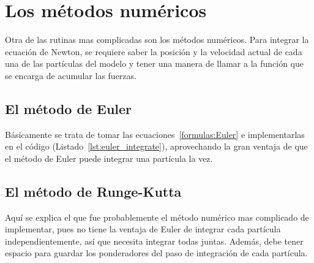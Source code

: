 

\section{Los métodos numéricos}
Otra de las rutinas mas complicadas son los métodos numéricos.
Para integrar la ecuación de Newton, se requiere saber la posición y la velocidad actual de cada una de las partículas del modelo y tener una manera de llamar a la función que se encarga de acumular las fuerzas.

\subsection{El método de Euler}
Básicamente se trata de tomar las ecuaciones~\ref{formulas:Euler} e implementarlas en el código (Listado~\ref{lst:euler_integrate}), aprovechando la gran ventaja de que el método de Euler puede integrar una partícula la vez.


\subsection{El método de Runge-Kutta}
Aquí se explica el que fue probablemente el método numérico mas complicado de implementar, pues no tiene la ventaja de Euler de integrar cada partícula independientemente, así que necesita integrar todas juntas.
Además, debe tener espacio para guardar los ponderadores del paso de integración de cada partícula.


